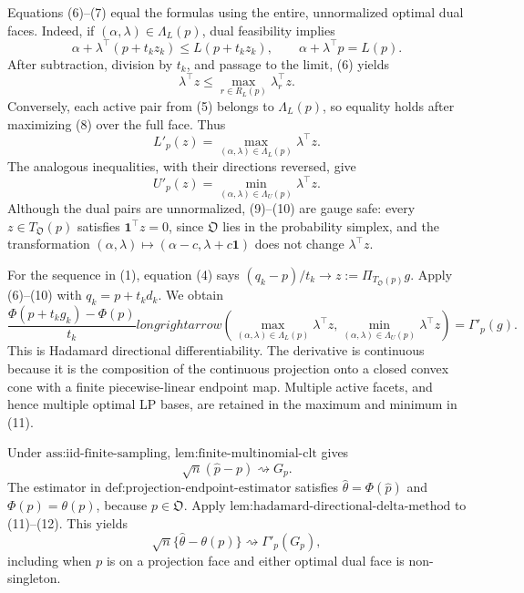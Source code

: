 Equations (6)--(7) equal the formulas using the entire, unnormalized optimal dual faces.  Indeed, if \((\alpha,\lambda)\in\Lambda_L(p)\), dual feasibility implies
\[
\alpha+\lambda^{\top}(p+t_kz_k)\leq L(p+t_kz_k),
\qquad
\alpha+\lambda^{\top}p=L(p).
\]
After subtraction, division by \(t_k\), and passage to the limit, (6) yields
\[
\lambda^{\top}z\leq\max_{r\in R_L(p)}\lambda_r^{\top}z.
\tag{8}
\]
Conversely, each active pair from (5) belongs to \(\Lambda_L(p)\), so equality holds after maximizing (8) over the full face.  Thus
\[
L'_p(z)=\max_{(\alpha,\lambda)\in\Lambda_L(p)}\lambda^{\top}z.
\tag{9}
\]
The analogous inequalities, with their directions reversed, give
\[
U'_p(z)=\min_{(\alpha,\lambda)\in\Lambda_U(p)}\lambda^{\top}z.
\tag{10}
\]
Although the dual pairs are unnormalized, (9)--(10) are gauge safe: every \(z\in T_{\mathfrak O}(p)\) satisfies \(\mathbf 1^{\top}z=0\), since \(\mathfrak O\) lies in the probability simplex, and the transformation \((\alpha,\lambda)\mapsto(\alpha-c,\lambda+c\mathbf1)\) does not change \(\lambda^{\top}z\).

For the sequence in (1), equation (4) says \((q_k-p)/t_k\to z:=\Pi_{T_{\mathfrak O}(p)}g\).  Apply (6)--(10) with \(q_k=p+t_kd_k\).  We obtain
\[
\frac{\Phi(p+t_kg_k)-\Phi(p)}{t_k}longrightarrow
\left(
\max_{(\alpha,\lambda)\in\Lambda_L(p)}\lambda^{\top}z,
\min_{(\alpha,\lambda)\in\Lambda_U(p)}\lambda^{\top}z
\right)
=\Gamma'_p(g).
\tag{11}
\]
This is Hadamard directional differentiability.  The derivative is continuous because it is the composition of the continuous projection onto a closed convex cone with a finite piecewise-linear endpoint map.  Multiple active facets, and hence multiple optimal LP bases, are retained in the maximum and minimum in (11).

Under \(\text{ass:iid-finite-sampling}\), \(\text{lem:finite-multinomial-clt}\) gives
\[
\sqrt n(\widehat p-p)\rightsquigarrow G_p.
\tag{12}
\]
The estimator in \(\text{def:projection-endpoint-estimator}\) satisfies \(\widehat\theta=\Phi(\widehat p)\) and \(\Phi(p)=\theta(p)\), because \(p\in\mathfrak O\).  Apply \(\text{lem:hadamard-directional-delta-method}\) to (11)--(12).  This yields
\[
\sqrt n\{\widehat\theta-\theta(p)\}\rightsquigarrow\Gamma'_p(G_p),
\]
including when \(p\) is on a projection face and either optimal dual face is non-singleton.